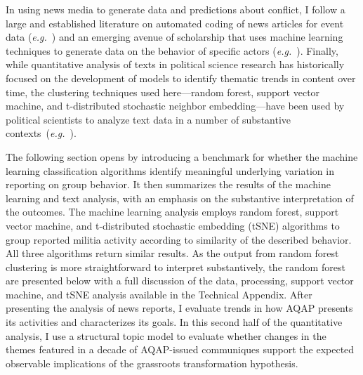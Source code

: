 In using news media to generate data and predictions about conflict, I follow a large and established literature on automated coding of news articles for event data (\textit{e.g.}~\cite{bond2003integrated, gerner1994machine,hammond2014using,king2003automated, raleigh2010introducing}) and an emerging avenue of scholarship that uses machine learning techniques to generate data on the behavior of specific actors (\textit{e.g.}~\cite{baum2018does, cook2019lost,  mueller2018reading}). Finally, while quantitative analysis of texts in political science research has historically focused on the development of models to identify thematic trends in content over time, the clustering  techniques used here---random forest, support vector machine, and t-distributed stochastic neighbor embedding---have been used by political scientists to analyze text data in a number of substantive contexts~(\textit{e.g.}~\cite{beauchamp2017predicting, jones2015exploratory, muchlinski2015comparing, siroky2009navigating,  spirling2012us}).

The following section opens by introducing a  benchmark for whether the machine learning classification algorithms identify meaningful underlying variation in reporting on group behavior. It then summarizes the results of the machine learning and text analysis, with an emphasis on the substantive interpretation of the outcomes. The machine learning analysis employs random forest, support vector machine, and t-distributed stochastic embedding (tSNE) algorithms to group reported militia activity according to similarity of the described behavior. All three algorithms return similar results. As the output from random forest clustering is more straightforward to interpret substantively, the random forest are presented below with a full discussion of the data, processing, support vector machine, and tSNE analysis available in the Technical Appendix.  After presenting the analysis of news reports, I evaluate trends in how AQAP presents its activities and characterizes its goals. In this second half of the quantitative analysis, I use a structural topic model to evaluate whether changes in the themes featured in a decade of AQAP-issued communiques support the expected observable implications of the grassroots transformation hypothesis. 


